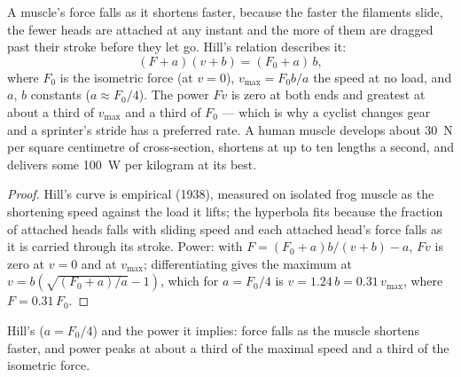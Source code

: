 \begin{theorem}\label{thm:b2:muscle-movement:hill}
A muscle's force falls as it shortens faster, because the faster
the filaments slide, the fewer heads are attached at any instant
and the more of them are dragged past their stroke before they let
go. Hill's relation describes it:
\[
(F + a)(v + b) = (F_0 + a)\,b,
\]
where $F_0$ is the isometric force (at $v = 0$), $v_{\max} =
F_0 b/a$ the speed at no load, and $a$, $b$ constants ($a \approx
F_0/4$). The power $Fv$ is zero at both ends and greatest at about a
third of $v_{\max}$ and a third of $F_0$ --- which is why a cyclist
changes gear and a sprinter's stride has a preferred rate. A human
muscle develops about \qty{30}{N} per square centimetre of
cross-section, shortens at up to ten lengths a second, and delivers
some \qty{100}{W} per kilogram at its best.
\end{theorem}
\begin{proof}
Hill's curve is empirical (1938), measured on isolated frog muscle
as the shortening speed against the load it lifts; the hyperbola
fits because the fraction of attached heads falls with sliding speed
and each attached head's force falls as it is carried through its
stroke. Power: with $F = (F_0 + a)b/(v + b) - a$, $Fv$ is zero at
$v = 0$ and at $v_{\max}$; differentiating gives the maximum at
$v = b(\sqrt{(F_0 + a)/a} - 1)$, which for $a = F_0/4$ is $v =
1.24\,b = 0.31\,v_{\max}$, where $F = 0.31\,F_0$.
\end{proof}

\begin{omfigure}

{\small Hill's  ($a = F_0/4$) and the power it
implies: force falls as the muscle shortens faster, and power peaks
at about a third of the maximal speed and a third of the isometric
force.}
\end{omfigure}

